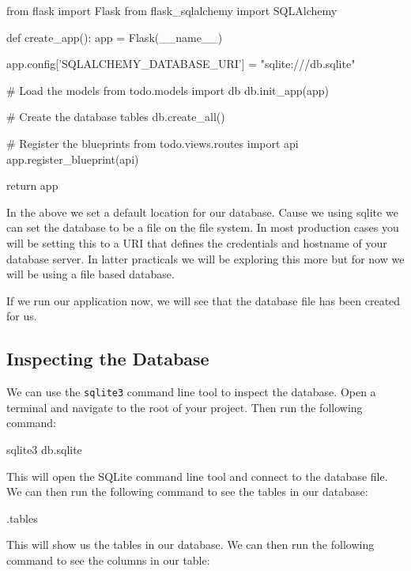 \documentclass{csse4400}
\begin{document}
\begin{code}[language=python,numbers=none]{}
  from flask import Flask
  from flask_sqlalchemy import SQLAlchemy

  def create_app():
      app = Flask(__name__)

      app.config['SQLALCHEMY_DATABASE_URI'] = "sqlite:///db.sqlite"

      # Load the models
      from todo.models import db
      db.init_app(app)

      # Create the database tables
      db.create_all()

      # Register the blueprints
      from todo.views.routes import api
      app.register_blueprint(api)

      return app

\end{code}

In the above we set a default location for our database. Cause we using sqlite we can set the database to be a file on the file system. In most production cases you will be setting this to a URI that defines the credentials and hostname of your database server. In latter practicals we will be exploring this more but for now we will be using a file based database.

If we run our application now, we will see that the database file has been created for us.


\subsection{Inspecting the Database}

We can use the \texttt{sqlite3} command line tool to inspect the database. Open a terminal and navigate to the root of your project. Then run the following command:

\begin{code}[language=bash,numbers=none]{}
  sqlite3 db.sqlite
\end{code}

This will open the SQLite command line tool and connect to the database file. We can then run the following command to see the tables in our database:

\begin{code}[language=sql,numbers=none]{}
  .tables
\end{code}

This will show us the tables in our database. We can then run the following command to see the columns in our table:
\end{document}
